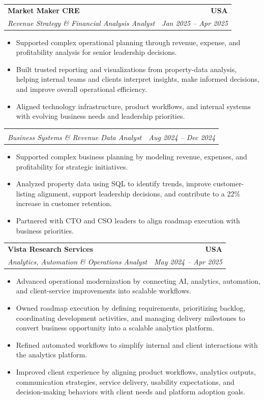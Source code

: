 \documentclass[letterpaper,10pt]{article}
\makeatletter
\newcommand{\resumeItem}[1]{\item \small{#1}}
\newcommand{\resumeSubheading}[4]{
  \vspace{1pt}\item
    \begin{tabular*}{1.0\textwidth}[t]{l@{\extracolsep{\fill}}r}
      \textbf{#1} & \textbf{\small #2} \\
      \textit{\small #3} & \textit{\small #4} \\
    \end{tabular*}\vspace{-6pt}
}
\newcommand{\resumeItemListStart}{\begin{itemize}[leftmargin=0.15in, itemsep=1pt, topsep=3pt]}
\newcommand{\resumeItemListEnd}{\end{itemize}\vspace{-2pt}}
\makeatother
\begin{document}
\vspace{-2pt}

\resumeSubheading
{Market Maker CRE}{USA}
{Revenue Strategy \& Financial Analysis Analyst}{Jan 2025 -- Apr 2025}
\resumeItemListStart
\resumeItem{Supported complex operational planning through revenue, expense, and profitability analysis for senior leadership decisions.}
\resumeItem{Built trusted reporting and visualizations from property-data analysis, helping internal teams and clients interpret insights, make informed decisions, and improve overall operational efficiency.}
\resumeItem{Aligned technology infrastructure, product workflows, and internal systems with evolving business needs and leadership priorities.}
\resumeItemListEnd

\vspace{-12pt}

\resumeSubheading
{}{}
{Business Systems \& Revenue Data Analyst}{Aug 2024 -- Dec 2024}
\resumeItemListStart
\resumeItem{Supported complex business planning by modeling revenue, expenses, and profitability for strategic initiatives.}
\resumeItem{Analyzed property data using SQL to identify trends, improve customer-listing alignment, support leadership decisions, and contribute to a 22\% increase in customer retention.}
\resumeItem{Partnered with CTO and CSO leaders to align roadmap execution with business priorities.}
\resumeItemListEnd

\vspace{-2pt}

\resumeSubheading
{Vista Research Services}{USA}
{Analytics, Automation \& Operations Analyst}{May 2024 -- Apr 2025}
\resumeItemListStart
\resumeItem{Advanced operational modernization by connecting AI, analytics, automation, and client-service improvements into scalable workflows.}
\resumeItem{Owned roadmap execution by defining requirements, prioritizing backlog, coordinating development activities, and managing delivery milestones to convert business opportunity into a scalable analytics platform.}
\resumeItem{Refined automated workflows to simplify internal and client interactions with the analytics platform.}
\resumeItem{Improved client experience by aligning product workflows, analytics outputs, communication strategies, service delivery, usability expectations, and decision-making behaviors with client needs and platform adoption goals.}
\resumeItemListEnd

\vspace{-2pt}
\end{document}

